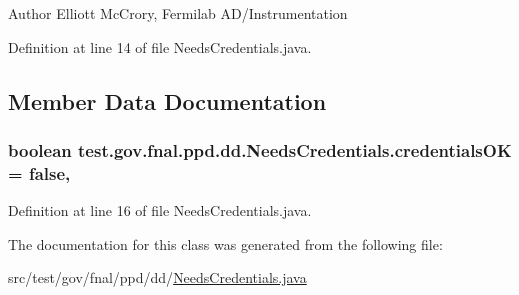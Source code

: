 \begin{DoxyAuthor}{Author}
Elliott Mc\-Crory, Fermilab A\-D/\-Instrumentation 
\end{DoxyAuthor}


Definition at line 14 of file Needs\-Credentials.\-java.



\subsection{Member Data Documentation}
\hypertarget{classtest_1_1gov_1_1fnal_1_1ppd_1_1dd_1_1NeedsCredentials_a2db70b93bc3c6d68e11319152311d616}{
\subsubsection[{credentials\-O\-K}]{\setlength{\rightskip}{0pt plus 5cm}boolean test.\-gov.\-fnal.\-ppd.\-dd.\-Needs\-Credentials.\-credentials\-O\-K = false\hspace{0.3cm}{\ttfamily [static]}, {\ttfamily [protected]}}}\label{classtest_1_1gov_1_1fnal_1_1ppd_1_1dd_1_1NeedsCredentials_a2db70b93bc3c6d68e11319152311d616}


Definition at line 16 of file Needs\-Credentials.\-java.



The documentation for this class was generated from the following file\-:\begin{DoxyCompactItemize}
\item 
src/test/gov/fnal/ppd/dd/\hyperlink{NeedsCredentials_8java}{Needs\-Credentials.\-java}\end{DoxyCompactItemize}
